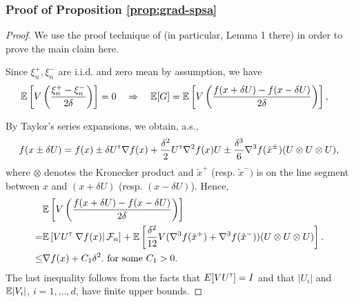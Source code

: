 \subsubsection*{Proof of Proposition \ref{prop:grad-spsa}}
\begin{proof}
We use the proof technique of \cite{spall1992multivariate} (in particular, Lemma 1 there) in order to prove the main claim here.
  
Since $\xi_n^+, \xi_n^-$ are i.i.d. and zero mean by assumption, we have
\begin{align*}
&\mathbb{E}\left[  V\left(\dfrac{\xi_n^+ - \xi_n^-}{2\delta}\right) \right]= 0 \quad \Rightarrow \quad
\mathbb{E}[G] =  \mathbb{E}\left[ V \left(\dfrac{f(x+\delta U)  - f(x-\delta U) }{2\delta}\right)\right],
\end{align*}

By Taylor's series expansions, we obtain, a.s.,
\begin{align*}
f(x \pm \delta U) = f(x) \pm \delta U^\mathsf{\scriptscriptstyle T} \nabla f(x) + \frac{\delta^2}{2} U^\mathsf{\scriptscriptstyle T} \nabla^2 f(x) U \pm  \frac{\delta^3}{6} \nabla^3 f(\tilde x^{\pm})(U \otimes U \otimes U),
\end{align*}
where $\otimes$ denotes the Kronecker product and $\tilde x^+$ (resp. $\tilde x^-)$ is on the line segment between $x$ and $(x + \delta U)$ (resp. $(x - \delta U)$).
Hence,
\begin{align}
&\mathbb{E}\left[V\left(\dfrac{f(x+\delta U) - f(x-\delta U)}{2\delta}\right) \right] \nonumber\\
= &\mathbb{E}\left[V U^\mathsf{\scriptscriptstyle T} \left.\nabla f(x)\right| \mathcal{F}_n\right]  +   \mathbb{E}\left[\frac{\delta^2}{12} V (\nabla^3 f(\tilde  x^+)+\nabla^3 f(\tilde  x^-))(U \otimes U \otimes U)\right]. \label{eq:l1}\\
\le & \nabla f(x) +  C_1 \delta^2.\label{eq:l2} \text{ for some } C_1>0.
\end{align}
The last inequality follows from the facts that $E[V U^\mathsf{\scriptscriptstyle T}] = I$ and that $|U_i|$ and $\mathbb{E}|V_i|$, $i=1,\ldots,d$, have finite upper bounds.


\end{proof}
